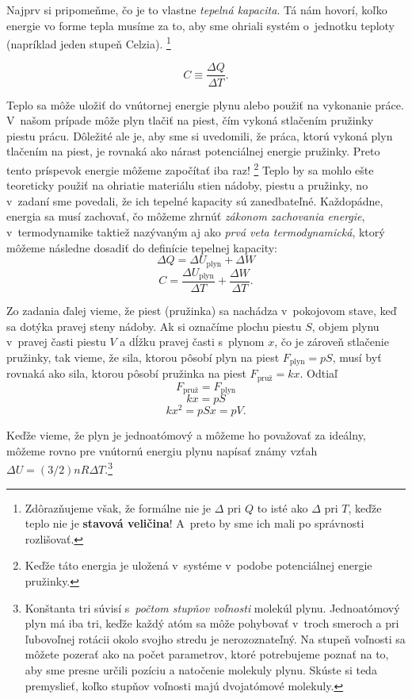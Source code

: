 Najprv si pripomeňme, čo je to vlastne \emph{tepelná kapacita}.
Tá nám hovorí, koľko energie vo forme tepla musíme  za to, aby sme ohriali systém o~jednotku teploty (napríklad jeden stupeň Celzia).%
\footnote{Zdôrazňujeme však, že formálne nie je $\Delta$ pri $Q$ to isté ako $\Delta$ pri $T$, keďže teplo nie je \textbf{stavová veličina}!
A~preto by sme ich mali po správnosti rozlišovať.}

$$C \equiv \frac{\Delta Q}{\Delta T} \text{.}$$

Teplo sa môže uložiť do vnútornej energie plynu alebo použiť na vykonanie práce. V~našom prípade môže plyn tlačiť na piest,
čím vykoná stlačením pružinky piestu prácu. Dôležité ale je, aby sme si uvedomili, že práca, ktorú vykoná plyn tlačením na
piest, je rovnaká ako nárast potenciálnej energie pružinky. Preto tento príspevok energie môžeme započítať iba raz!%
\footnote{Keďže táto energia je uložená v~systéme  v~podobe potenciálnej energie pružinky.}
Teplo by sa mohlo ešte teoreticky použiť na ohriatie materiálu stien nádoby, piestu a pružinky, no v~zadaní sme povedali,
že ich tepelné kapacity sú zanedbateľné. Každopádne, energia sa musí zachovať, čo môžeme zhrnúť \emph{zákonom zachovania
energie}, v~termodynamike taktiež nazývaným aj ako \emph{prvá veta termodynamická}, ktorý môžeme následne dosadiť do definície
tepelnej kapacity:
$$ \Delta Q = \Delta U_{\text{plyn}} + \Delta W $$
$$C = \frac{\Delta U_{\text{plyn}}}{\Delta T} + \frac{\Delta W}{\Delta T}\text{.}$$

Zo zadania ďalej vieme, že piest (pružinka) sa nachádza v~pokojovom stave, keď sa dotýka pravej steny nádoby. Ak si označíme 
plochu piestu $S$, objem plynu v~pravej časti piestu $V$ a dĺžku pravej časti s~plynom $x$, čo je zároveň stlačenie pružinky, tak 
vieme, že sila, ktorou pôsobí plyn na piest $F_{\text{plyn}}=pS$, musí byť rovnaká ako sila, ktorou pôsobí pružinka na piest 
$F_{\text{pruž}} = kx$. Odtiaľ
$$F_{\text{pruž}} = F_{\text{plyn}}$$
$$kx = pS$$
$$kx^2 = pSx = pV\text{.}$$

Keďže vieme, že plyn je jednoatómový a môžeme ho považovať za ideálny, môžeme rovno pre vnútornú energiu plynu 
napísať známy vzťah $\Delta U = (3/2)nR\Delta T$.\footnote{Konštanta tri súvisí s~\emph{počtom stupňov voľnosti} molekúl plynu.
Jednoatómový plyn má iba tri, keďže každý atóm sa môže pohybovať v~troch smeroch a pri ľubovoľnej rotácii okolo svojho stredu
je nerozoznateľný. Na stupeň voľnosti sa môžete pozerať ako na počet parametrov, ktoré potrebujeme poznať na to, aby sme
presne určili pozíciu a natočenie molekuly plynu. Skúste si teda premyslieť, koľko stupňov voľnosti majú dvojatómové molekuly.}

